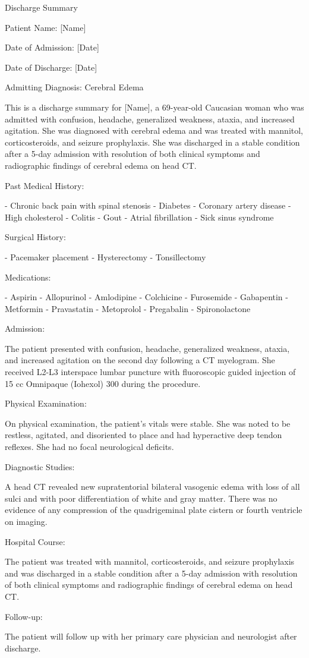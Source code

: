 Discharge Summary

Patient Name: [Name]

Date of Admission: [Date]

Date of Discharge: [Date]

Admitting Diagnosis: Cerebral Edema

This is a discharge summary for [Name], a 69-year-old Caucasian woman who was admitted with confusion, headache, generalized weakness, ataxia, and increased agitation. She was diagnosed with cerebral edema and was treated with mannitol, corticosteroids, and seizure prophylaxis. She was discharged in a stable condition after a 5-day admission with resolution of both clinical symptoms and radiographic findings of cerebral edema on head CT.

Past Medical History:

- Chronic back pain with spinal stenosis
- Diabetes
- Coronary artery disease
- High cholesterol
- Colitis
- Gout
- Atrial fibrillation
- Sick sinus syndrome

Surgical History:

- Pacemaker placement
- Hysterectomy
- Tonsillectomy

Medications:

- Aspirin
- Allopurinol
- Amlodipine
- Colchicine
- Furosemide
- Gabapentin
- Metformin
- Pravastatin
- Metoprolol
- Pregabalin
- Spironolactone

Admission:

The patient presented with confusion, headache, generalized weakness, ataxia, and increased agitation on the second day following a CT myelogram. She received L2-L3 interspace lumbar puncture with fluoroscopic guided injection of 15 cc Omnipaque (Iohexol) 300 during the procedure.

Physical Examination:

On physical examination, the patient's vitals were stable. She was noted to be restless, agitated, and disoriented to place and had hyperactive deep tendon reflexes. She had no focal neurological deficits.

Diagnostic Studies:

A head CT revealed new supratentorial bilateral vasogenic edema with loss of all sulci and with poor differentiation of white and gray matter. There was no evidence of any compression of the quadrigeminal plate cistern or fourth ventricle on imaging.

Hospital Course:

The patient was treated with mannitol, corticosteroids, and seizure prophylaxis and was discharged in a stable condition after a 5-day admission with resolution of both clinical symptoms and radiographic findings of cerebral edema on head CT.

Follow-up:

The patient will follow up with her primary care physician and neurologist after discharge.